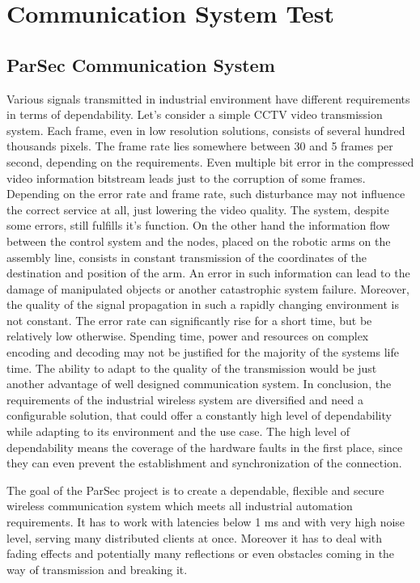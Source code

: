 \chapter{Communication System Test}



\section {ParSec Communication System}
Various signals transmitted in industrial environment have different requirements in terms of dependability. Let's consider a simple CCTV video transmission system. Each frame, even in low resolution solutions, consists of several hundred thousands pixels. The frame rate lies somewhere between 30 and 5 frames per second, depending on the requirements. Even multiple bit error in the compressed video information bitstream leads just to the corruption of some frames. Depending on the error rate and frame rate, such disturbance may not influence the correct service at all, just lowering the video quality. The system, despite some errors, still fulfills it's function. 
On the other hand the information flow between the control system and the nodes, placed on the robotic arms on the assembly line, consists in constant transmission of the coordinates of the destination and position of the arm. An error in such information can lead to the damage of manipulated objects or another catastrophic system failure.
Moreover, the quality of the signal propagation in such a rapidly changing environment is not constant. The error rate can significantly rise for a short time, but be relatively low otherwise. Spending time, power and resources on complex encoding and decoding may not be justified for the majority of the systems life time. The ability to adapt to the quality of the transmission would be just another advantage of well designed communication system.
In conclusion, the requirements of the industrial wireless system are diversified and need a configurable solution, that could offer a constantly high level of dependability while adapting to its environment and the use case. The high level of dependability means the coverage of the hardware faults in the first place, since they can even prevent the establishment and synchronization of the connection.

The goal of the ParSec project is to create a dependable, flexible and secure wireless communication system which meets all industrial automation requirements. It has to work with latencies below 1 ms and with very high noise level, serving many distributed clients at once. Moreover it has to deal with fading effects and potentially many reflections or even obstacles coming in the way of transmission and breaking it.

